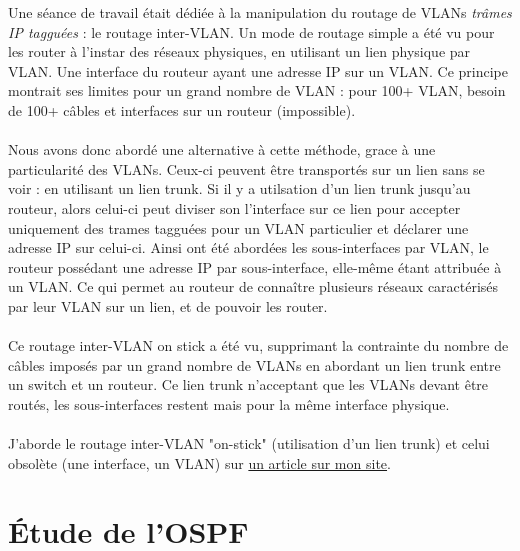 Une séance de travail était dédiée à la manipulation du routage de VLANs \textit{trâmes IP tagguées} : le routage inter-VLAN. Un mode de routage simple a été vu pour les router à l'instar des réseaux physiques, en utilisant un lien physique par VLAN. Une interface du routeur ayant une adresse IP sur un VLAN. Ce principe montrait ses limites pour un grand nombre de VLAN : pour 100+ VLAN, besoin de 100+ câbles et interfaces sur un routeur (impossible). 
\\ \\
Nous avons donc abordé une alternative à cette méthode, grace à une particularité des VLANs. Ceux-ci peuvent être transportés sur un lien sans se voir : en utilisant un lien trunk. Si il y a utilsation d'un lien trunk jusqu'au routeur, alors celui-ci peut diviser son l'interface sur ce lien pour accepter uniquement des trames tagguées pour un VLAN particulier et déclarer une adresse IP sur celui-ci. Ainsi ont été abordées les sous-interfaces par VLAN, le routeur possédant une adresse IP par sous-interface, elle-même étant attribuée à un VLAN. Ce qui permet au routeur de connaître plusieurs réseaux caractérisés par leur VLAN sur un lien, et de pouvoir les router.
\\ \\
Ce routage inter-VLAN on stick a été vu, supprimant la contrainte du nombre de câbles imposés par un grand nombre de VLANs en abordant un lien trunk entre un switch et un routeur. Ce lien trunk n'acceptant que les VLANs devant être routés, les sous-interfaces restent mais pour la même interface physique.
\\ \\
J'aborde le routage inter-VLAN "on-stick" (utilisation d'un lien trunk) et celui obsolète (une interface, un VLAN) sur \href{http://xeylou.fr/posts/cisco-inter-VLAN/}{un article sur mon site}.

\section{Étude de l'OSPF}

